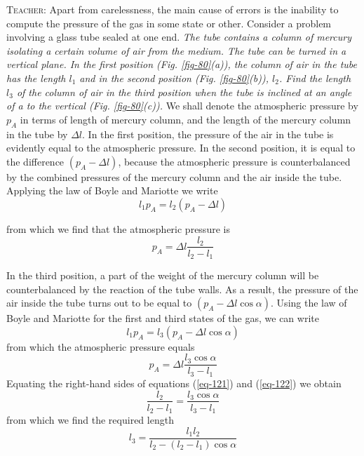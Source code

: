 \documentclass[a4paper,sfsidenotes]{tufte-book}
\begin{document}
\textsc{Teacher:} Apart from carelessness, the main cause of errors is the inability to compute the pressure of the gas in some state or other. Consider a problem involving a glass tube sealed at one end. \emph{The tube contains a column of mercury isolating a certain volume of air from the medium. The tube can be turned in a vertical plane. In the first position (\emph{Fig. \ref{fig-80}(a)}), the column of air in the tube has the length $l_{1}$ and in the second position (\emph{Fig. \ref{fig-80}(b)}), $l_{2}$. Find the length $l_{3}$ of the column of air in the third position when the tube is inclined at an angle of a to the vertical (\emph{Fig. \ref{fig-80}(c)}).} We shall denote the atmospheric pressure by $p_{A}$ in terms of length of mercury column, and the length of the mercury column in the tube by $\Delta l$. In the first position, the pressure of the air in the tube is evidently equal to the atmospheric pressure. In the second position, it is equal to the difference $(p_{A}-\Delta l)$, because the atmospheric pressure is counterbalanced by the combined pressures of the mercury column and the air inside the tube. Applying the law of Boyle and Mariotte we write
\begin{equation*}%
l_{1} p_{A} = l_{2} (p_{A} -\Delta l)
\end{equation*}

from which we find that the atmospheric pressure is
\begin{equation}%
p_{A} = \Delta l \frac{l_{2}}{l_{2} - l_{1}}
\label{eq-121}
\end{equation}

In the third position, a part of the weight of the mercury column will be counterbalanced by the
reaction of the tube walls. As a result, the pressure of the air inside the tube turns out to be equal to $(p_{A}-\Delta l \cos \alpha)$. Using the law of Boyle and Mariotte for the first and third states of the gas, we can write 
\begin{equation*}%
l_{1} p_{A} = l_{3} (p_{A} -\Delta l \cos \alpha)
\end{equation*}
from which the atmospheric pressure equals
\begin{equation}%
p_{A} = \Delta l \frac{l_{3} \cos \alpha}{l_{3} - l_{1}}
\label{eq-122}
\end{equation}
Equating the right-hand sides of equations (\ref{eq-121}) and (\ref{eq-122}) we obtain
\begin{equation*}%
\frac{l_{2}}{l_{2} - l_{1}} = \frac{l_{3} \cos \alpha}{l_{3} - l_{1}}
\end{equation*}
from which we find the required length
\begin{equation}%
l_{3}  = \frac{l_{1} l_{2}}{l_{2} -(l_{2} -  l_{1})\cos \alpha}
\label{eq-123}
\end{equation}
\end{document}
